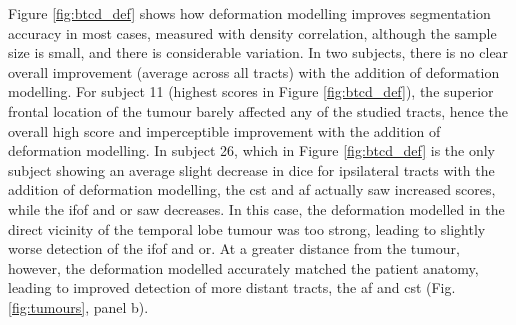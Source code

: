 Figure \ref{fig:btcd_def} shows how deformation modelling improves segmentation accuracy in most cases, measured with density correlation, although the sample size is small, and there is considerable variation.
In two subjects, there is no clear overall improvement (average across all tracts) with the addition of deformation modelling.
For subject 11 (highest scores in Figure \ref{fig:btcd_def}), the superior frontal location of the tumour barely affected any of the studied tracts, hence the overall high score and imperceptible improvement with the addition of deformation modelling.
In subject 26, which in Figure \ref{fig:btcd_def} is the only subject showing an average slight decrease in \gls{dice} for ipsilateral tracts with the addition of deformation modelling, the \gls{cst} and \gls{af} actually saw increased scores, while the \gls{ifof} and \gls{or} saw decreases.
In this case, the deformation modelled in the direct vicinity of the temporal lobe tumour was too strong, leading to slightly worse detection of the \gls{ifof} and \gls{or}.
At a greater distance from the tumour, however, the deformation modelled accurately matched the patient anatomy, leading to improved detection of more distant tracts, the \gls{af} and \gls{cst} (Fig. \ref{fig:tumours}, panel b).
